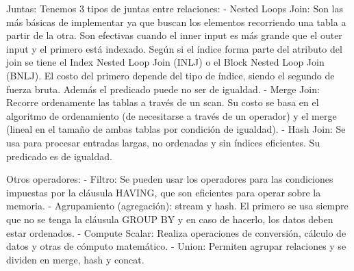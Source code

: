 Juntas:
Tenemos 3 tipos de juntas entre relaciones:
- Nested Loops Join: Son las más básicas de implementar ya que buscan los elementos recorriendo una tabla a partir de la otra. Son efectivas cuando el inner input es más grande que el outer input y el primero está indexado. Según si el índice forma parte del atributo del join se tiene el Index Nested Loop Join (INLJ) o el Block Nested Loop Join (BNLJ). El costo del primero depende del tipo de índice, siendo el segundo de fuerza bruta. Además el predicado puede no ser de igualdad.
- Merge Join: Recorre ordenamente las tablas a través de un scan. Su costo se basa en el algoritmo de ordenamiento (de necesitarse a través de un operador) y el merge (lineal en el tamaño de ambas tablas por condición de igualdad).
- Hash Join: Se usa para procesar entradas largas, no ordenadas y sin índices eficientes. Su predicado es de igualdad.

Otros operadores:
- Filtro: Se pueden usar los operadores para las condiciones impuestas por la cláusula HAVING, que son eficientes para operar sobre la memoria. 
- Agrupamiento (agregación): stream y hash. El primero se usa siempre que no se tenga la cláusula GROUP BY y en caso de hacerlo, los datos deben estar ordenados.
- Compute Scalar: Realiza operaciones de conversión, cálculo de datos y otras de cómputo matemático.
- Union: Permiten agrupar relaciones y se dividen en merge, hash y concat.

